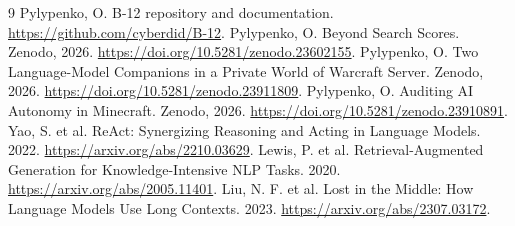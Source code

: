 \documentclass[11pt]{article}
\begin{document}
\begin{thebibliography}{9}
 Pylypenko, O. B-12 repository and documentation. \url{https://github.com/cyberdid/B-12}.
 Pylypenko, O. Beyond Search Scores. Zenodo, 2026. \url{https://doi.org/10.5281/zenodo.23602155}.
 Pylypenko, O. Two Language-Model Companions in a Private World of Warcraft Server. Zenodo, 2026. \url{https://doi.org/10.5281/zenodo.23911809}.
 Pylypenko, O. Auditing AI Autonomy in Minecraft. Zenodo, 2026. \url{https://doi.org/10.5281/zenodo.23910891}.
 Yao, S. et al. ReAct: Synergizing Reasoning and Acting in Language Models. 2022. \url{https://arxiv.org/abs/2210.03629}.
 Lewis, P. et al. Retrieval-Augmented Generation for Knowledge-Intensive NLP Tasks. 2020. \url{https://arxiv.org/abs/2005.11401}.
 Liu, N. F. et al. Lost in the Middle: How Language Models Use Long Contexts. 2023. \url{https://arxiv.org/abs/2307.03172}.
\end{thebibliography}
\end{document}
